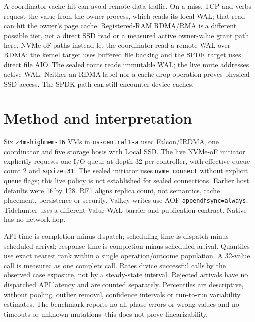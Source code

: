 \documentclass[10pt,a4paper]{article}
\begin{document}
A coordinator-cache hit can avoid remote data traffic. On a miss, TCP and verbs request the value from the owner process, which reads its local WAL; that read can hit the owner's page cache. Registered-RAM RDMA/RMA is a different possible tier, not a direct SSD read or a measured active owner-value grant path here. NVMe-oF paths instead let the coordinator read a remote WAL over RDMA: the kernel target uses buffered file backing and the SPDK target uses direct file AIO. The sealed route reads immutable WAL; the live route addresses active WAL. Neither an RDMA label nor a cache-drop operation proves physical SSD access. The SPDK path can still encounter device caches.

\section{Method and interpretation}
Six \texttt{z4m-highmem-16} VMs in \texttt{us-central1-a} used Falcon/IRDMA, one coordinator and five storage hosts with Local SSD. The live NVMe-oF initiator explicitly requests one I/O queue at depth 32 per controller, with effective queue count 2 and \texttt{sqsize=31}. The sealed initiator uses \texttt{nvme connect} without explicit queue flags; this live policy is not established for sealed connections. Earlier host defaults were 16 by 128. RF1 aligns replica count, not semantics, cache placement, persistence or security. Valkey writes use AOF \texttt{appendfsync=always}; Tidehunter uses a different Value-WAL barrier and publication contract. Native has no network hop.

API time is completion minus dispatch; scheduling time is dispatch minus scheduled arrival; response time is completion minus scheduled arrival. Quantiles use exact nearest rank within a single operation/outcome population. A 32-value call is measured as one complete call. Rates divide successful calls by the observed case exposure, not by a steady-state interval. Rejected arrivals have no dispatched API latency and are counted separately. Percentiles are descriptive, without pooling, outlier removal, confidence intervals or run-to-run variability estimates. The benchmark reports no all-phase errors or wrong values and no timeouts or unknown mutations; this does not prove linearizability.
\end{document}

